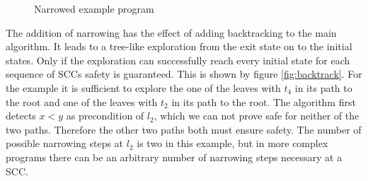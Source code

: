 \begin{figure}
\centering
{}
\caption{Narrowed example program}
\label{fig:narrowed}
\end{figure}

The addition of narrowing has the effect of adding backtracking to the main algorithm.
It leads to a tree-like exploration from the exit state on to the initial states.
Only if the exploration can successfully reach every initial state for each sequence of SCCs safety is guaranteed.
This is shown by figure \ref{fig:backtrack}.
For the example it is sufficient to explore the one of the leaves with $t_4$ in its path to the root and one of the leaves with $t_2$ in its path to the root.
The algorithm first detects $x < y$ as precondition of $l_2$, which we can not prove safe for neither of the two paths.
Therefore the other two paths both must ensure safety.
The number of possible narrowing steps at $l_2$ is two in this example, but in more complex programs there can be an arbitrary number of narrowing steps necessary at a SCC.

